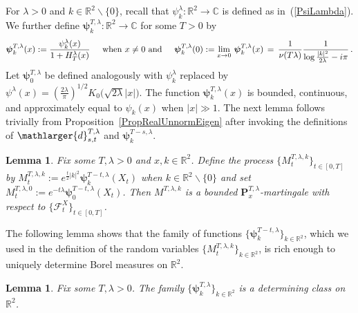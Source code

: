 \documentclass[10pt]{article}
\numberwithin{equation}{section}
\newtheorem{lemma}[theorem]{Lemma}
\theoremstyle{definition}
\newcommand{\R}{{\mathbb R}}
\newcommand{\C}{{\mathbb C}}
\begin{document}
\begin{appendix}
For $\lambda>0$ and $k\in \R^2\backslash\{0\}$, recall that $\psi_k^{\lambda}:\R^2\rightarrow \C$ is defined as in~(\ref{PsiLambda}).  We further define $\boldsymbol{\psi}^{T,\lambda}_{k }:\R^2\rightarrow \C $ for some $T>0$  by $$ \boldsymbol{\psi}^{T,\lambda}_{k }(x):= \frac{ \psi^{\lambda }_{k}(x)  }{ 1+H_{T}^{\lambda}(x)  }  \hspace{.5cm}  \text{when $x\neq 0$ and} \hspace{.5cm}  \boldsymbol{\psi}^{T,\lambda}_{k}(0):= \lim_{x\rightarrow 0  }\,\boldsymbol{\psi}^{T,\lambda}_{k}(x)\,=\,\frac{1}{\nu(T\lambda)} \frac{1}{\log \frac{|k|^2}{2\lambda} -i\pi  }\,. $$  
Let $\boldsymbol{\psi}^{T,\lambda}_{0 }$ be defined analogously with $\psi^{\lambda }_{k}$ replaced by  $\psi^{\lambda }(x)=(\frac{2\lambda}{\pi})^{1/2} K_0\big(\sqrt{2\lambda} |x|  \big)$.  The function $\boldsymbol{\psi}^{T,\lambda}_{k}(x)$ is  bounded, continuous, and approximately equal to $\psi_k(x)$ when $|x|\gg 1$.  The next lemma  follows trivially from   Proposition~\ref{PropRealUnnormEigen}  after invoking the definitions of $\mathlarger{d}_{s,t}^{T,\lambda}$ and $\boldsymbol{\psi}^{T-s,\lambda}_{k}$.
\begin{lemma}\label{LemmaBasicMart}  Fix some $T,\lambda>0$ and $x,k\in \R^2$.  Define the process   $\{  M^{T,\lambda,k}_t \}_{t\in [0,T]}  $  by $ M^{T,\lambda,k}_t:=e^{\frac{t}{2}|k|^2    } \boldsymbol{\psi}^{T-t,\lambda}_{k}(X_t)$ when $k\in \R^2\backslash\{0\}$ and set $ M^{T,\lambda,0}_t:=e^{-t\lambda    } \boldsymbol{\psi}^{T-t,\lambda}_{0}(X_t)$.   Then $M^{T,\lambda,k}$ 
is a bounded   $\mathbf{P}^{T,\lambda}_{x}$-martingale with respect to $\{\mathscr{F}^X_t\}_{t\in [0,T]}$.
\end{lemma}



The following  lemma  shows that the family of functions $\{ \boldsymbol{\psi}_{k}^{T-t,\lambda}  \}_{k\in \R^2 }  $, which we used in  the definition of the  random variables   $\{M^{T,\lambda,k}_t\}_{k\in \R^2}$,   is rich enough to uniquely  determine Borel measures on $\R^2$.
\begin{lemma}\label{LemmaCompleteSet}  Fix some $T,\lambda>0$. The family $\{ \boldsymbol{\psi}^{T,\lambda}_{k} \}_{k\in \R^2  } $
is a determining class  on $\R^2$.
\end{lemma}


\end{appendix}
\end{document}
